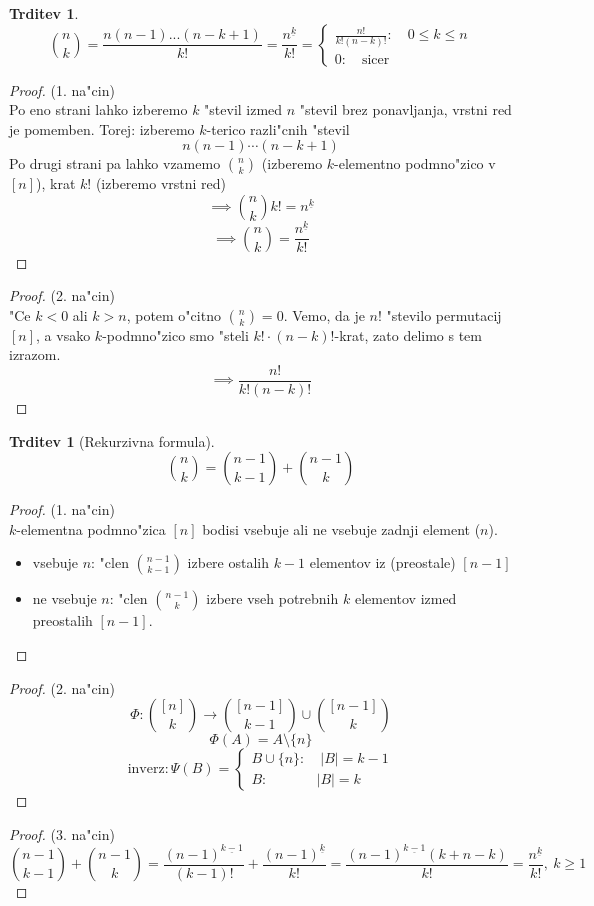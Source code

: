\documentclass[a4paper,12pt]{article}
\theoremstyle{definition}
\newtheorem{claim}[counter]{Trditev}
\theoremstyle{remark}
\begin{document}
\begin{claim}
	\[\binom{n}{k} = \frac{n(n-1)...(n-k+1)}{k!} = \frac{n^{\underline{k}}}{k!} = \begin{cases}\frac{n!}{k!(n-k)!}: \quad 0 \leq k \leq n   \\ 0: \quad \text{sicer} \end{cases}\]
\end{claim}
\begin{proof}(1. na"cin)\\
	Po eno strani lahko izberemo $k$ "stevil izmed $n$ "stevil brez ponavljanja, vrstni red je pomemben.
	Torej: izberemo $k$-terico razli"cnih "stevil
	\[n(n-1)\cdots(n-k+1)\]
	Po drugi strani pa lahko vzamemo $\binom{n}{k}$ (izberemo $k$-elementno podmno"zico v $[n]$), krat $k!$ (izberemo vrstni red)
	\[\implies \binom{n}{k} k! = n^{\underline{k}}\]
	\[\implies \binom{n}{k} = \frac{n^{\underline{k}}}{k!}\]
\end{proof}
\begin{proof}(2. na"cin)\\
	"Ce $k < 0$ ali $k > n$, potem o"citno $\binom{n}{k} = 0$. Vemo, da je $n!$ "stevilo permutacij $[n]$, a vsako $k$-podmno"zico smo "steli $k!\cdot(n-k)!$-krat, zato delimo s tem izrazom.
	\[\implies \frac{n!}{k! (n-k)!}\]
\end{proof}

\begin{claim}[Rekurzivna formula]
	\[\binom{n}{k} = \binom{n-1}{k-1} + \binom{n-1}{k}\]
\end{claim}

\begin{proof}(1. na"cin)\\
	$k$-elementna podmno"zica $[n]$ bodisi vsebuje ali ne vsebuje zadnji element ($n$).
	\begin{itemize}
	    \item vsebuje $n$: "clen $\binom{n-1}{k-1}$ izbere ostalih $k-1$ elementov iz (preostale) $[n-1]$
	    \item ne vsebuje $n$: "clen $\binom{n-1}{k}$ izbere vseh potrebnih $k$ elementov izmed preostalih $[n-1]$.
	\end{itemize}
\end{proof}
\begin{proof}(2. na"cin)\\
	\[\Phi : \binom{[n]}{k}\rightarrow \binom{[n - 1]}{k - 1} \cup \binom{[n - 1]}{k}\]
	\[\Phi (A) = A \setminus \{n\}\]
	\[\text{inverz}: \Psi(B) = \begin{cases}B \cup \{n\}: \quad |B| = k - 1 \\ B: \qquad \quad \ \ |B| = k \end{cases}\]
\end{proof}
\begin{proof}(3. na"cin)\\
	\[\binom{n - 1}{k - 1}+\binom{n-1}{k} = \frac{(n-1)^{\underline{k-1}}}{(k-1)!} + \frac{(n-1)^{\underline{k}}}{k!} = \frac{(n-1)^{\underline{k-1}}(k+n-k)}{k!} = \frac{n^{\underline{k}}}{k!}, \ k \geqslant1\]
\end{proof}
\end{document}
